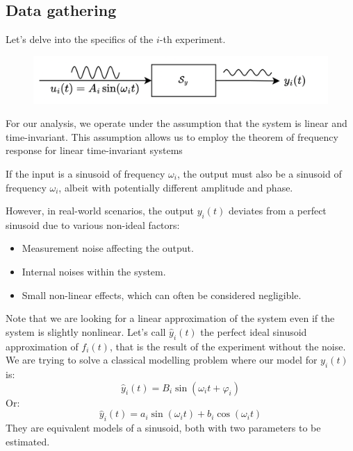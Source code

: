 \subsection{Data gathering}
Let's delve into the specifics of the $i$-th experiment. 
\begin{figure}[H]
    \centering
    \includegraphics[width=0.6\linewidth]{images/exp1.png}
\end{figure}
For our analysis, we operate under the assumption that the system is linear and time-invariant. 
This assumption allows us to employ the theorem of frequency response for linear time-invariant systems
\begin{theorem}
    If the input is a sinusoid of frequency $\omega_i$, the output must also be a sinusoid of frequency $\omega_i$, albeit with potentially different amplitude and phase.
\end{theorem}
However, in real-world scenarios, the output $y_i(t)$ deviates from a perfect sinusoid due to various non-ideal factors:
\begin{itemize}
    \item Measurement noise affecting the output.
    \item Internal noises within the system.
    \item Small non-linear effects, which can often be considered negligible.
\end{itemize}
Note that we are looking for a linear approximation of the system even if the system is slightly nonlinear. 
Let's call $\hat{y}_i(t)$ the perfect ideal sinusoid approximation of $f_i(t)$, that is the result of the experiment without the noise. 
We are trying to solve a classical modelling problem where our model for $y_i(t)$ is:
\[\hat{y}_i(t)=B_i\sin\left(\omega_i t+\varphi_i\right)\]
Or: 
\[\hat{y}_i(t)=a_i\sin\left(\omega_i t\right)+b_i\cos\left(\omega_i t\right)\]
They are equivalent models of a sinusoid, both with two parameters to be estimated. 

